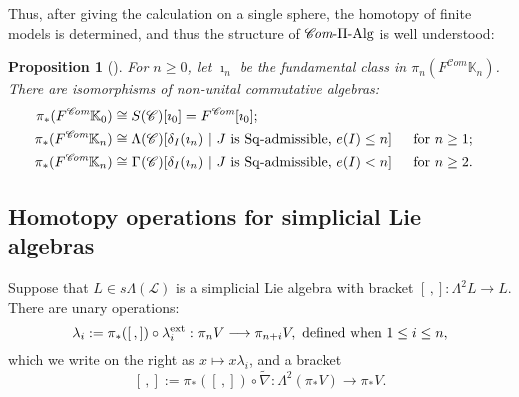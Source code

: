 \documentclass[11pt]{amsart}
\theoremstyle{plain}
\newtheorem{prop}[thm]{Proposition}
\theoremstyle{definition}
\renewcommand{\to}{\longrightarrow}
\newcommand{\scrL}{\mathscr{L}}
\newcommand{\scrC}{\mathscr{C}}
\theoremstyle{plain}
\newcommand{\LieOperad}{{\scrL}}
\newcommand{\CommOperad}{{\scrC}}
\newcommand{\PiAlg}{\textup{-$\Pi$-Alg}}
\newcommand{\Sq}{\mathrm{Sq}}
\newcommand{\algs}{{\scrC\!\textit{om}}}
\begin{document}
\begin{Constructing (co)homotopy operations}
\noindent Thus, after giving the calculation on a single sphere, the homotopy of finite models is determined, and thus the structure of $\algs\PiAlg$ is well understood:
\begin{prop}[{\cite[Proposition 2.7]{MR1089001}}]
\noindent For $n\geq0$, let $\imath_n$ be the fundamental class in $\pi_n(F^{\algs}\mathbb{K}_n)$. There  are isomorphisms of non-unital commutative algebras:
\begin{alignat*}{2}
\pi_*(F^{\algs}\mathbb{K}_0)
&\cong
S(\CommOperad)[\imath_0]=F^{\algs}[\imath_0];%
\\
\pi_*(F^{\algs}\mathbb{K}_n)
&\cong
\makebox[\widthof{$\Lambda$}][c]{$\Lambda$}(\CommOperad)[\delta_I(\imath_n)\ |\ \textup{$J$ is $\Sq$-admissible, $e(I)\leq n$}]%
&\ \ &\makebox[\widthof{for $n\geq1$}][c]{for $n\geq1$;}\\
\pi_*(F^{\algs}\mathbb{K}_n)
&\cong
\makebox[\widthof{$\Lambda$}][c]{$\Gamma$}(\CommOperad)[\delta_I(\imath_n)\ |\ \textup{$J$ is $\Sq$-admissible, $e(I)< n$}]%
&\ \ &\makebox[\widthof{for $n\geq1$}][c]{for $n\geq2$.}%
\end{alignat*}
\end{prop}

\subsection{Homotopy operations for simplicial Lie algebras}\label{Homotopy operations for simplicial Lie algebras}
Suppose that $L\in s \Lambda(\LieOperad)$ is a simplicial Lie algebra with bracket $[\,,]:\Lambda^2L\to L$. There are unary operations:
\[\lambda_i:=\pi_*([\,,])\circ\lambda_i^\textup{ext}:\pi_nV\to \pi_{n+i}V,\textup{ defined when }1\leq i\leq n,\]
which we write on the right as $x\mapsto x\lambda_i$, and a bracket
\[[\,,]:=\pi_*([\,,])\circ\widetilde{\nabla}:\Lambda^2(\pi_*V)\to \pi_{*}V.\]


\end{Constructing (co)homotopy operations}
\end{document}
